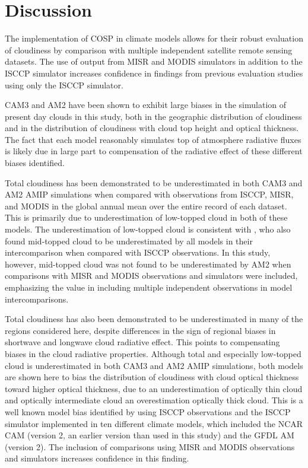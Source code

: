 \section{Discussion}
The implementation of COSP in climate models allows for their robust evaluation of cloudiness by comparison with multiple independent satellite remote sensing datasets. The use of output from MISR and MODIS simulators in addition to the ISCCP simulator increases confidence in findings from previous evaluation studies using only the ISCCP simulator. 

CAM3 and AM2 have been shown to exhibit large biases in the simulation of present day clouds in this study, both in the geographic distribution of cloudiness and in the distribution of cloudiness with cloud top height and optical thickness. The fact that each model reasonably simulates top of atmosphere radiative fluxes is likely due in large part to compensation of the radiative effect of these different biases identified.

Total cloudiness has been demonstrated to be underestimated in both CAM3 and AM2 AMIP simulations when compared with observations from ISCCP, MISR, and MODIS in the global annual mean over the entire record of each dataset. This is primarily due to underestimation of low-topped cloud in both of these models. The underestimation of low-topped cloud is consistent with \cite{zhang_et_al_2005}, who also found mid-topped cloud to be underestimated by all models in their intercomparison when compared with ISCCP observations. In this study, however, mid-topped cloud was not found to be underestimated by AM2 when comparisons with MISR and MODIS observations and simulators were included, emphasizing the value in including multiple independent observations in model intercomparisons.

Total cloudiness has also been demonstrated to be underestimated in many of the regions considered here, despite differences in the sign of regional biases in shortwave and longwave cloud radiative effect. This points to compensating biases in the cloud radiative properties. Although total and especially low-topped cloud is underestimated in both CAM3 and AM2 AMIP simulations, both models are shown here to bias the distribution of cloudiness with cloud optical thickness toward higher optical thickness, due to an underestimation of optically thin cloud and optically intermediate cloud an overestimation optically thick cloud. This is a well known model bias identified by \cite{zhang_et_al_2005} using ISCCP observations and the ISCCP simulator implemented in ten different climate models, which included the NCAR CAM (version 2, an earlier version than used in this study) and the GFDL AM (version 2). The inclusion of comparisons using MISR and MODIS observations and simulators increases confidence in this finding.

